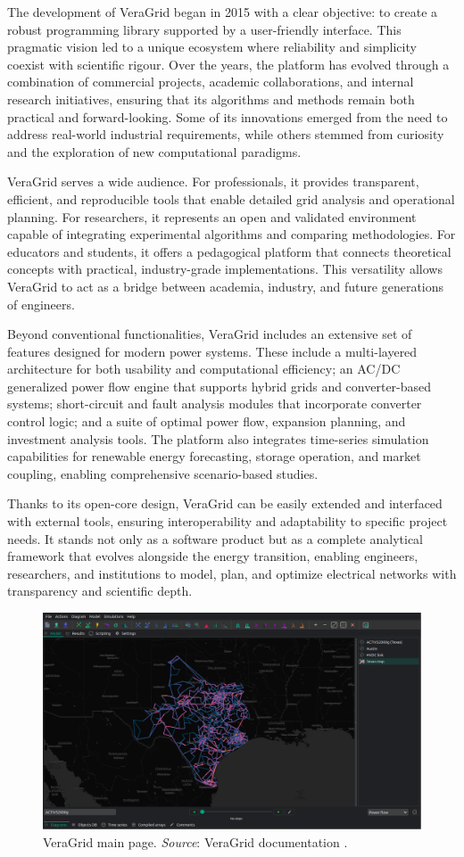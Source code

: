 The development of VeraGrid began in 2015 with a clear objective: to create a robust programming library supported by a user-friendly interface. 
This pragmatic vision led to a unique ecosystem where reliability and simplicity coexist with scientific rigour. Over the years, the platform has evolved through a combination 
of commercial projects, academic collaborations, and internal research initiatives, ensuring that its algorithms and methods remain both practical and forward-looking. 
Some of its innovations emerged from the need to address real-world industrial requirements, while others stemmed from curiosity and the exploration of new computational paradigms.

VeraGrid serves a wide audience. For professionals, it provides transparent, efficient, and reproducible tools that enable detailed grid analysis and operational planning. 
For researchers, it represents an open and validated environment capable of integrating experimental algorithms and comparing methodologies. For educators and students, 
it offers a pedagogical platform that connects theoretical concepts with practical, industry-grade implementations. This versatility allows VeraGrid to act as a bridge between 
academia, industry, and future generations of engineers.

Beyond conventional functionalities, VeraGrid includes an extensive set of features designed for modern power systems. 
These include a multi-layered architecture for both usability and computational efficiency; an AC/DC generalized power flow engine that supports hybrid 
grids and converter-based systems; short-circuit and fault analysis modules that incorporate converter control logic; and a suite of optimal power flow, expansion planning, 
and investment analysis tools. The platform also integrates time-series simulation capabilities for renewable energy forecasting, storage operation, and market coupling, 
enabling comprehensive scenario-based studies. 

Thanks to its open-core design, VeraGrid can be easily extended and interfaced with external tools, ensuring interoperability and adaptability to specific project needs. 
It stands not only as a software product but as a complete analytical framework that evolves alongside the energy transition, enabling engineers, researchers, and institutions 
to model, plan, and optimize electrical networks with transparency and scientific depth.

\begin{figure}[H]
  \centering
  \includegraphics[width=0.8\linewidth]{figures/VeraGrid_main_page.png}
  \caption{VeraGrid main page. \textit{Source}: VeraGrid documentation \cite{veragrid}.}
  \label{fig:VeraGrid_main}
\end{figure}


\newpage